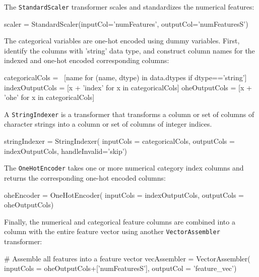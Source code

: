 \begin{samepage}
The \texttt{StandardScaler} transformer scales and standardizes the numerical features:
\begin{pythoncode}
scaler = StandardScaler(inputCol='numFeatures',
                        outputCol='numFeaturesS')
\end{pythoncode}
\end{samepage}

The categorical variables are one-hot encoded using dummy variables. First, identify the columns with 'string' data type, and construct column names for the indexed and one-hot encoded corresponding columns:

\begin{samepage}
\begin{pythoncode}
categoricalCols = \
    [name for (name, dtype) in data.dtypes if dtype=='string']
indexOutputCols = [x + 'index' for x in categoricalCols]
oheOutputCols = [x + 'ohe' for x in categoricalCols]
\end{pythoncode}
\end{samepage}

A \texttt{StringIndexer} is a transformer that transforms a column or set of columns of character strings into a column or set of columns of integer indices.

\begin{samepage}
\begin{pythoncode}
stringIndexer = StringIndexer(
    inputCols = categoricalCols,
    outputCols = indexOutputCols,
    handleInvalid='skip')
\end{pythoncode}
\end{samepage}

The \texttt{OneHotEncoder} takes one or more numerical category index columns and returns the corresponding one-hot encoded columns:

\begin{samepage}
\begin{pythoncode}
oheEncoder = OneHotEncoder(
    inputCols = indexOutputCols,
    outputCols = oheOutputCols)
\end{pythoncode}
\end{samepage}

Finally, the numerical and categorical feature columns are combined into a column with the entire feature vector using another \texttt{VectorAssembler} transformer:

\begin{samepage}
\begin{pythoncode}
# Assemble all features into a feature vector
vecAssembler = VectorAssembler(
    inputCols = oheOutputCols+['numFeaturesS'],
    outputCol = 'feature_vec')
\end{pythoncode}
\end{samepage}

